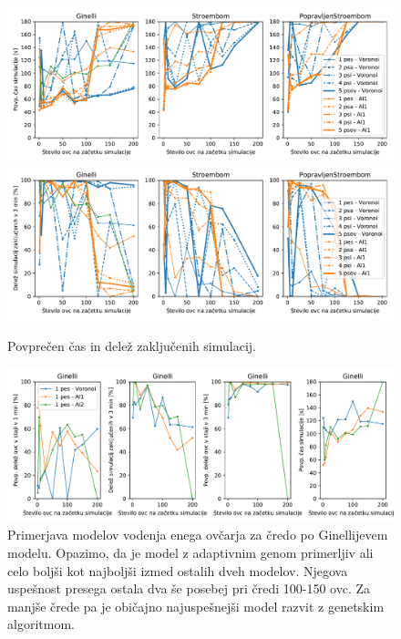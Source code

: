 \begin{figure}[ht]  %
	\centering
	\includegraphics[width=\textwidth]{../poglavja/grafi/cas.pdf}
	\includegraphics[width=\textwidth]{../poglavja/grafi/zakljucene.pdf}
	\caption[Povprečen čas in delež zaključenih simulacij]{Povprečen čas in delež zaključenih simulacij.} %
	\label{fig:cas}
\end{figure}

\begin{figure}[ht]  %
	\centering
	\includegraphics[width=\textwidth]{../poglavja/grafi/1-Ginelli.pdf}
	\caption[Primerjava modelov vodenja enega ovčarja]{Primerjava modelov vodenja enega ovčarja za čredo po Ginellijevem modelu. Opazimo, da je model z adaptivnim genom primerljiv ali celo boljši kot najboljši izmed ostalih dveh modelov. Njegova uspešnost presega ostala dva še posebej pri čredi 100-150 ovc. Za manjše črede pa je običajno najuspešnejši model razvit z genetskim algoritmom.} %
	\label{fig:1gin}
\end{figure}


